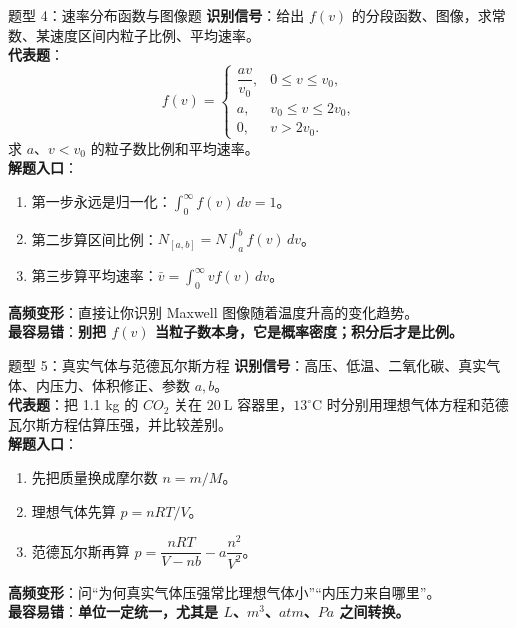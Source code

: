 \documentclass[11pt,a4paper]{ctexart}
\newcommand{\warn}[1]{\textcolor{red!70!black}{\textbf{#1}}}
\begin{document}
\begin{typebox}{题型 4：速率分布函数与图像题}
\textbf{识别信号}：给出 \(f(v)\) 的分段函数、图像，求常数、某速度区间内粒子比例、平均速率。\\
\textbf{代表题}：
\[
f(v)=
\begin{cases}
\dfrac{av}{v_0}, & 0\le v\le v_0,\\[4pt]
a, & v_0\le v\le 2v_0,\\
0, & v>2v_0.
\end{cases}
\]
求 \(a\)、\(v<v_0\) 的粒子数比例和平均速率。\\
\textbf{解题入口}：
\begin{enumerate}
  \item 第一步永远是归一化：\(\int_0^\infty f(v)\,dv=1\)。
  \item 第二步算区间比例：\(N_{[a,b]}=N\int_a^b f(v)\,dv\)。
  \item 第三步算平均速率：\(\bar v=\int_0^\infty vf(v)\,dv\)。
\end{enumerate}
\textbf{高频变形}：直接让你识别 Maxwell 图像随着温度升高的变化趋势。\\
\textbf{最容易错}：\warn{别把 \(f(v)\) 当粒子数本身，它是概率密度；积分后才是比例。}
\end{typebox}

\begin{typebox}{题型 5：真实气体与范德瓦尔斯方程}
\textbf{识别信号}：高压、低温、二氧化碳、真实气体、内压力、体积修正、参数 \(a,b\)。\\
\textbf{代表题}：把 1.1 kg 的 \(CO_2\) 关在 \(20\ \mathrm{L}\) 容器里，\(13^\circ\mathrm{C}\) 时分别用理想气体方程和范德瓦尔斯方程估算压强，并比较差别。\\
\textbf{解题入口}：
\begin{enumerate}
  \item 先把质量换成摩尔数 \(n=m/M\)。
  \item 理想气体先算 \(p=nRT/V\)。
  \item 范德瓦尔斯再算 \(p=\dfrac{nRT}{V-nb}-a\dfrac{n^2}{V^2}\)。
\end{enumerate}
\textbf{高频变形}：问“为何真实气体压强常比理想气体小”“内压力来自哪里”。\\
\textbf{最容易错}：\warn{单位一定统一，尤其是 \(L\)、\(m^3\)、\(atm\)、\(Pa\) 之间转换。}
\end{typebox}
\end{document}
